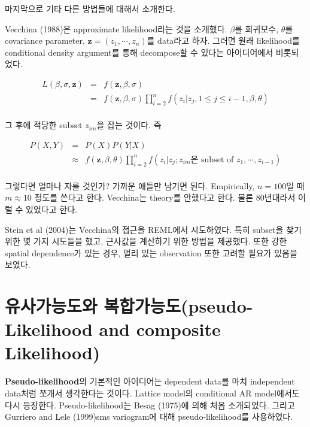 \documentclass[b5paper,]{scrbook}
\theoremstyle{plain}
\theoremstyle{definition}
\numberwithin{equation}{section}
\begin{document}
마지막으로 기타 다른 방법들에 대해서 소개한다.

Vecchina (1988)은 approximate likelihood라는 것을 소개했다. \(\beta\)를
회귀모수, \(\theta\)를 covariance parameter,
\(\mathbf{z}=(z_{1}, \cdots , z_{n})\)를 data라고 하자. 그러면 원래
likelihood를 conditional density argument를 통해 decompose할 수 있다는
아이디어에서 비롯되었다.

\begin{eqnarray*}
L(\beta, \sigma, \mathbf{z}) &=& f(\mathbf{z}, \beta, \sigma)\\
&=&f(\mathbf{z}, \beta, \sigma) \prod_{i=2}^{n}f(z_{i}|z_{j}, 1 \leq j \leq i-1, \beta, \theta)\\
\end{eqnarray*}

그 후에 적당한 subset \(z_{im}\)을 잡는 것이다. 즉

\begin{eqnarray*}
P(X,Y)&=&P(X)P(Y|X)\\
&\approx& f(\mathbf{z},\beta, \theta)\prod_{i=2}^{n}f(z_{i}|z_{j}; z_{im}\text{은 subset of }z_{1}, \cdots ,z_{i-1})\\
\end{eqnarray*}

그렇다면 얼마나 자를 것인가? 가까운 애들만 남기면 된다. Empirically,
\(n=100\)일 때 \(m \approx 10\) 정도를 쓴다고 한다. Vecchina는 theory를
안했다고 한다. 물론 80년대라서 이럴 수 있었다고 한다.

Stein et al (2004)는 Vecchina의 접근을 REML에서 시도하였다. 특히
subset을 찾기 위한 몇 가지 시도들을 했고, 근사값을 계산하기 위한 방법을
제공했다. 또한 강한 spatial dependence가 있는 경우, 멀리 있는
observation 또한 고려할 필요가 있음을 보였다.

\section{유사가능도와 복합가능도(pseudo-Likelihood and composite
Likelihood)}\label{-pseudo-likelihood-and-composite-likelihood}

\textbf{Pseudo-likelihood}의 기본적인 아이디어는 dependent data를 마치
independent data처럼 쪼개서 생각한다는 것이다. Lattice model의
conditional AR model에서도 다시 등장한다. Pseudo-likelihood는 Besag
(1975)에 의해 처음 소개되었다. 그리고 Gurriero and Lele (1999)sms
variogram에 대해 pseudo-likelihood를 사용하였다.
\end{document}
